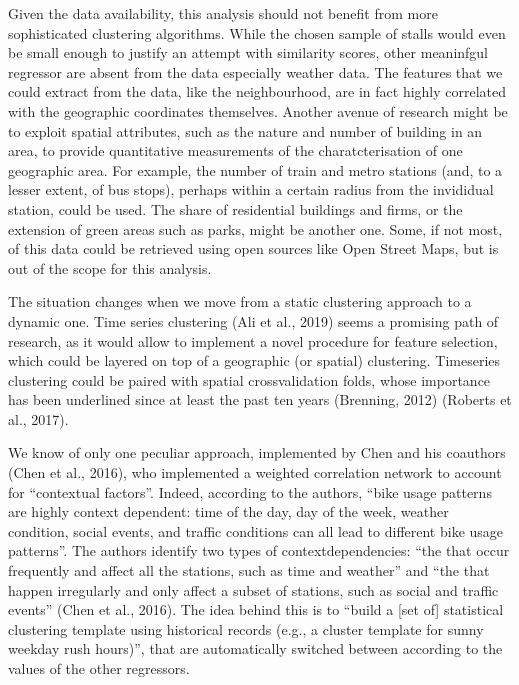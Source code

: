 \documentclass[letterpaper,10pt,english]{jupyterBook}
\begin{document}
\sphinxAtStartPar
Given the data availability, this analysis should not benefit from more sophisticated clustering algorithms. While the chosen sample of stalls would even be small enough to justify an attempt with similarity scores, other meaninfgul regressor are absent from the data \sphinxhyphen{} especially weather data. The features that we could extract from the data, like the neighbourhood, are in fact highly correlated with the geographic coordinates themselves. Another avenue of research might be to exploit spatial attributes, such as the nature and number of building in an area, to provide quantitative measurements of the charatcterisation of one geographic area. For example, the number of train and metro stations (and, to a lesser extent, of bus stops), perhaps within a certain radius from the invididual station, could be used. The share of residential buildings and firms, or the extension of green areas such as parks, might be another one. Some, if not most, of this data could be retrieved using open sources like Open Street Maps, but is out of the scope for this analysis.

\sphinxAtStartPar
The situation changes when we move from a static clustering approach to a dynamic one. Time series clustering (Ali et al., 2019) seems a promising path of research, as it would allow to implement a novel procedure for feature selection, which could be layered on top of a geographic (or spatial) clustering. Time\sphinxhyphen{}series clustering could be paired with spatial cross\sphinxhyphen{}validation folds, whose importance has been underlined since at least the past ten years (Brenning, 2012) (Roberts et al., 2017).

\sphinxAtStartPar
We know of only one peculiar approach, implemented by Chen and his coauthors (Chen et al., 2016), who implemented a weighted correlation network to account for “contextual factors”. Indeed, according to the authors, “bike usage patterns are highly context dependent: time of the day, day of the week, weather condition, social events, and traffic conditions can all lead to different bike usage patterns”. The authors identify two types of context\sphinxhyphen{}dependencies: “the  that occur frequently and affect all the stations, such as time and weather” and “the  that happen irregularly and only affect a subset of stations, such as social and traffic events” (Chen et al., 2016). The idea behind this is to “build a {[}set of{]} statistical clustering template using historical records (e.g., a cluster template for sunny weekday rush hours)”, that are automatically switched between according to the values of the other regressors.
\end{document}
